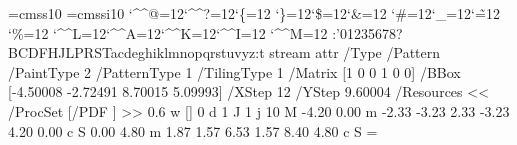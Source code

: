 \font\THFa=cmss10
\font\THFb=cmssi10
\begingroup
\catcode`\^^@=12\catcode`\^^?=12\catcode`\{=12
\catcode`\}=12\catcode`\$=12\catcode`\&=12
\catcode`\#=12\catcode`\_=12\catcode`\~=12
\catcode`\%=12
\catcode`\^^L=12\catcode`\^^A=12\catcode`\^^K=12\catcode`\^^I=12
\catcode`\^^M=12
\THFa:'01235678?BCDFHJLPRSTacdeghiklmnopqrstuvyz\endinclude{}\THFb:t\endinclude\endgroup
\immediate\pdfobj stream attr {/Type /Pattern
/PaintType 2 /PatternType 1 /TilingType 1
/Matrix [1 0 0 1 0 0]
/BBox [-4.50008 -2.72491 8.70015 5.09993]
/XStep 12
/YStep 9.60004
/Resources << /ProcSet [/PDF ] >> } {
0.6 w
[] 0 d
1 J
1 j
10 M
-4.20 0.00 m
-2.33 -3.23 2.33 -3.23 4.20 0.00 c
S
0.00 4.80 m
1.87 1.57 6.53 1.57 8.40 4.80 c
S
} \newcount \THPa\THPa=\pdflastobj
